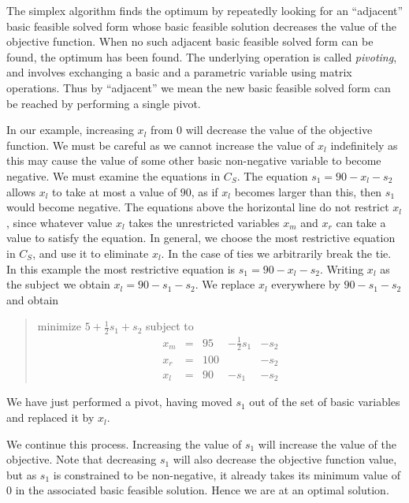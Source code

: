 \documentclass{uist96}
\begin{document}
The simplex algorithm finds the optimum by repeatedly looking for an
``adjacent'' basic feasible solved form whose basic feasible solution
decreases the value of the objective function.  When no such adjacent basic
feasible solved form can be found, the optimum has been found.  The
underlying operation is called {\em pivoting}, and involves exchanging a
basic and a parametric variable using matrix operations.  Thus by
``adjacent'' we mean the new basic feasible solved form can be reached by
performing a single pivot.

In our example, increasing $x_l$ from $0$ will decrease the value of the
objective function.  We must be careful as we cannot increase the value of
$x_l$ indefinitely as this may cause the value of some other
basic non-negative variable to become negative.  We must examine the
equations in $C_S$\@.  The equation $s_1 = 90 - x_l - s_2$ allows $x_l$ to
take at most a value of $90$, as if $x_l$ becomes larger than this, then
$s_1$ would become negative.  The equations above the horizontal line do not
restrict $x_l$, since whatever value $x_l$ takes the unrestricted variables
$x_m$ and $x_r$ can take a value to satisfy the equation.  In general,
we choose the most restrictive equation in $C_S$, and use it to eliminate
$x_l$\@.  In the case of ties we arbitrarily break the tie. In this example
the most restrictive equation is $s_1 = 90 - x_l - s_2$\@.  Writing $x_l$ as
the subject we obtain $x_l = 90 - s_1 - s_2$\@.  We replace $x_l$ everywhere
by $90 - s_1 - s_2$ and obtain
\begin{quote}\vspace*{-1ex}
minimize $5 + \frac{1}{2} s_1 + s_2$ 
subject to 
$$
\begin{array}{rlrrr} 
x_m & = &95 & - \frac{1}{2} s_1 & - s_2 \\
x_r & = &100 &  & - s_2 \\ \hline
x_l & = &90 & - s_1 & - s_2 
\end{array}
$$
\end{quote}\vspace{-0.9ex}

We have just performed a pivot, having moved $s_1$ out of the set of basic
variables and replaced it by $x_l$\@.

We continue this process.  Increasing the value of $s_1$ will increase the
value of the objective.  Note that decreasing $s_1$ will also decrease the
objective function value, but as $s_1$ is constrained to be non-negative,
it already takes its minimum value of $0$ in the associated basic feasible
solution.  Hence we are at an optimal solution.  
\end{document}
